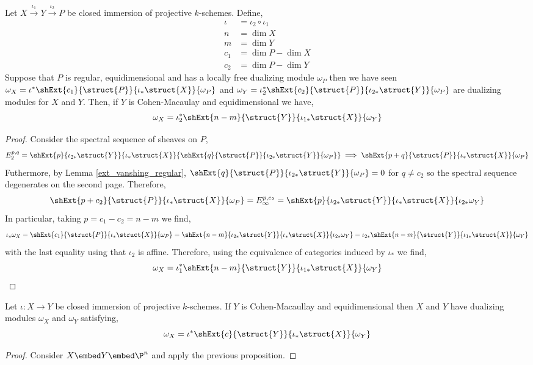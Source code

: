\documentclass[12pt]{article}
\begin{document}
\begin{prop}
Let $X \xrightarrow{\iota_1} Y \xrightarrow{\iota_2} P$ be closed immersion of projective $k$-schemes. Define,
\begin{align*}
\iota & = \iota_2 \circ \iota_1
\\
n  & = \dim{X}
\\
m & = \dim{Y}
\\
c_1 & = \dim{P} - \dim{X}
\\
c_2 & = \dim{P} - \dim{Y}
\end{align*} 
Suppose that $P$ is regular, equidimensional and has a locally free dualizing module $\omega_P$ then we have seen $\omega_X = \iota^* \shExt{c_1}{\struct{P}}{\iota_* \struct{X}}{\omega_P}$ and $\omega_Y = \iota_2^* \shExt{c_2}{\struct{P}}{\iota_{2*} \struct{Y}}{\omega_P}$ are dualizing modules for $X$ and $Y$. Then, if $Y$ is Cohen-Macaulay and equidimensional we have,
\[ \omega_X = \iota_2^* \shExt{n-m}{\struct{Y}}{\iota_{1*} \struct{X}}{\omega_Y} \]
\end{prop}

\begin{proof}
Consider the spectral sequence of sheaves on $P$,
\[ E^{p,q}_2 = \shExt{p}{\iota_{2*} \struct{Y}}{\iota_* \struct{X}}{\shExt{q}{\struct{P}}{\iota_{2*} \struct{Y}}{\omega_P}} \implies \shExt{p+q}{\struct{P}}{\iota_* \struct{X}}{\omega_P} \]
Futhermore, by Lemma \ref{ext_vanshing_regular}, $\shExt{q}{\struct{P}}{\iota_{2*} \struct{Y}}{\omega_P} = 0$ for $q \neq c_2$ so the spectral sequence degenerates on the second page. Therefore, 
\[ \shExt{p + c_2}{\struct{P}}{\iota_* \struct{X}}{\omega_P} = E^{p,c_2}_\infty = \shExt{p}{\iota_{2*} \struct{Y}}{\iota_* \struct{X}}{\iota_{2*} \omega_Y} \]
In particular, taking $p = c_1 - c_2 = n - m$ we find, 
\[ \iota_* \omega_X = \shExt{c_1}{\struct{P}}{\iota_* \struct{X}}{\omega_P} = \shExt{n -m}{\iota_{2*} \struct{Y}}{\iota_* \struct{X}}{\iota_{2*} \omega_Y} = \iota_{2*} \shExt{n-m}{\struct{Y}}{\iota_{1*} \struct{X}}{\omega_Y} \]
with the last equality using that $\iota_{2}$ is affine.
Therefore, using the equivalence of categories induced by $\iota_*$ we find,
\[ \omega_X = \iota_{1}^* \shExt{n-m}{\struct{Y}}{\iota_{1*} \struct{X}}{\omega_Y} \]
\end{proof}

\begin{cor}
Let $\iota : X \to Y$ be closed immersion of projective $k$-schemes. If $Y$ is Cohen-Macaullay and equidimensional then $X$ and $Y$ have dualizing modules $\omega_X$ and $\omega_Y$ satisfying,
\[ \omega_X = \iota^* \shExt{c}{\struct{Y}}{\iota_* \struct{X}}{\omega_Y} \] 
\end{cor}

\begin{proof}
Consider $X \embed Y \embed \P^n$ and apply the previous proposition. 
\end{proof}
\end{document}
